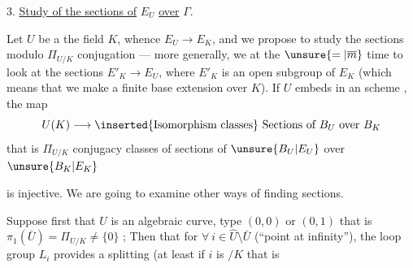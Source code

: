 3. \uline{Study of the sections of} $E_U$ \uline{over} $\Gamma$.

Let $U$ be a   the field $K$, whence $E_U\longrightarrow E_K$, and we propose to study the sections modulo $\Pi_{U/K}$ conjugation --- more generally, we  at the $\unsure{=|\overline m}$ time to look at the sections $E'_K\longrightarrow E_U$, where $E'_K$ is an open subgroup of $E_K$ (which means that we make a finite base extension over $K$). If  $U$ embeds in an  scheme , the map
\[
U(K)\longrightarrow \inserted{\text{Isomorphism classes}}\ \text{Sections of }B_U\text{ over }B_K
\]
that is $\Pi_{U/K}$ conjugacy classes of sections of $\unsure{B_U|E_U}$ over $\unsure{B_K|E_K}$

is injective. We are going to examine other  ways of finding sections.

Suppose first that $U$ is an algebraic curve,   type $(0,0)$ or $(0,1)$ that is $\pi_1(\bar U)=\Pi_{U/K}\ne\{0\}$ ; Then  that for $\forall\ i\in\widehat U\setminus\bar U$ (``point at infinity''), the loop group $L_i$ provides a splitting (at least if $i$ is $/K$ that is 

